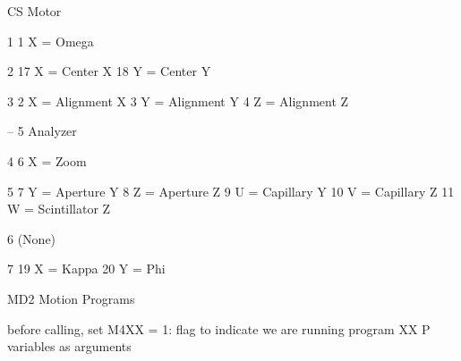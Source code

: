 \begin{DoxyPre}
  CS       Motor\end{DoxyPre}



\begin{DoxyPre}  1		1	X = Omega\end{DoxyPre}



\begin{DoxyPre}  2		17	X = Center X
		18	Y = Center Y\end{DoxyPre}



\begin{DoxyPre}  3		2	X = Alignment X
		3	Y = Alignment Y
		4	Z = Alignment Z\end{DoxyPre}



\begin{DoxyPre}  --            5       Analyzer\end{DoxyPre}



\begin{DoxyPre}  4		6	X = Zoom\end{DoxyPre}



\begin{DoxyPre}  5		7	Y = Aperture Y
		8	Z = Aperture Z
		9	U = Capillary Y
	       10	V = Capillary Z
	       11	W = Scintillator Z\end{DoxyPre}



\begin{DoxyPre}  6			(None)\end{DoxyPre}



\begin{DoxyPre}  7	       19	X = Kappa
	       20	Y = Phi\end{DoxyPre}



\begin{DoxyPre}\end{DoxyPre}


MD2 Motion Programs


\begin{DoxyPre}\end{DoxyPre}



\begin{DoxyPre}before calling, set
   M4XX = 1:  flag to indicate we are running program XX
   P variables as arguments\end{DoxyPre}



